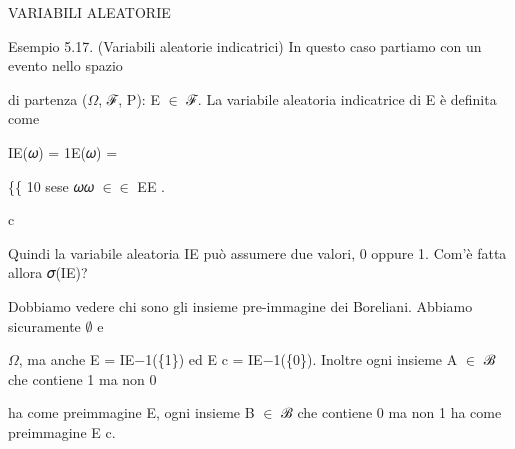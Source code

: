 \documentclass[a4paper,portrait,12pt]{article}
\begin{document}





\begin{flushleft}
VARIABILI ALEATORIE
\end{flushleft}





\begin{flushleft}
Esempio 5.17. (Variabili aleatorie indicatrici) In questo caso partiamo con un evento nello spazio
\end{flushleft}


\begin{flushleft}
di partenza ($\Omega$, ℱ, P): E $\in$ ℱ. La variabile aleatoria indicatrice di E \`{e} definita come
\end{flushleft}


\begin{flushleft}
IE(𝜔) = 1E(𝜔) =
\end{flushleft}





\begin{flushleft}
\{\{ 10 sese 𝜔𝜔 $\in$$\in$ EE .
\end{flushleft}


\begin{flushleft}
c
\end{flushleft}





\begin{flushleft}
Quindi la variabile aleatoria IE pu\`{o} assumere due valori, 0 oppure 1. Com'\`{e} fatta allora 𝜎(IE)?
\end{flushleft}


\begin{flushleft}
Dobbiamo vedere chi sono gli insieme pre-immagine dei Boreliani. Abbiamo sicuramente $\emptyset$ e
\end{flushleft}


\begin{flushleft}
$\Omega$, ma anche E = IE$-$1(\{1\}) ed E c = IE$-$1(\{0\}). Inoltre ogni insieme A $\in$ ℬ che contiene 1 ma non 0
\end{flushleft}


\begin{flushleft}
ha come preimmagine E, ogni insieme B $\in$ ℬ che contiene 0 ma non 1 ha come preimmagine E c.
\end{flushleft}
\end{document}
